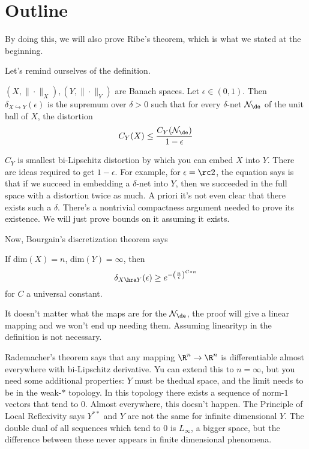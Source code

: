 \section{Outline}

By doing this, we will also prove Ribe's theorem, which is what we stated at the beginning. 

Let's remind ourselves of the definition.

\begin{df*}
$(X, \|\cdot\|_X), (Y, \|\cdot\|_Y)$ are Banach spaces. Let $\epsilon \in (0, 1)$. Then $\delta_{X \hookrightarrow Y}(\epsilon)$ is the supremum over $\delta > 0$ such that for every $\delta$-net $\cal N_{\de}$ of the unit ball of $X$, the distortion 
\[
C_Y(X) \leq \frac{C_Y(\cal N_{\de})}{1 - \epsilon}
\]
\end{df*}
$C_Y$ is smallest bi-Lipschitz distortion by which you can embed $X$ into $Y$. There are ideas required to get $1 - \epsilon$. For example, for $\epsilon = \rc2$, the equation says is that if we succeed in embedding a $\delta$-net into $Y$, then we succeeded in the full space with a distortion twice as much. A priori it's not even clear that there exists such a $\delta$. There's a nontrivial compactness argument needed to prove its existence. We will just prove bounds on it assuming it exists. 

Now, Bourgain's discretization theorem says 
\begin{thm*}
If dim$(X) = n$, dim$(Y) = \infty$, then 
\[
\delta_{X \hra Y}(\epsilon) \geq e^{-\left(\frac{n}{\epsilon}\right)^{C*n}}
\]
for $C$ a universal constant. 
\end{thm*}

\begin{rem}
It doesn't matter what the maps are for the $\cal N_\de$, the proof will give a linear mapping and we won't end up needing them. Assuming linearityp in the definition is not necessary. 


Rademacher's theorem says that any mapping $\R^n \to \R^n$ is differentiable almost everywhere with bi-Lipschitz derivative. Yu can extend this to $n = \infty$, but you need some additional properties: $Y$ must be thedual space, and the limit needs to be in the weak-$*$ topology. In this topology there exists a sequence of norm-$1$ vectors that tend to $0$. 
Almost everywhere, this doesn't happen. The Principle of Local Reflexivity  says $Y^{**}$ and $Y$ are not the same for infinite dimensional $Y$. The double dual of all sequences which tend to $0$ is $L_{\infty}$, a bigger space, but the difference between these never appears in finite dimensional phenomena. 
\end{rem}

